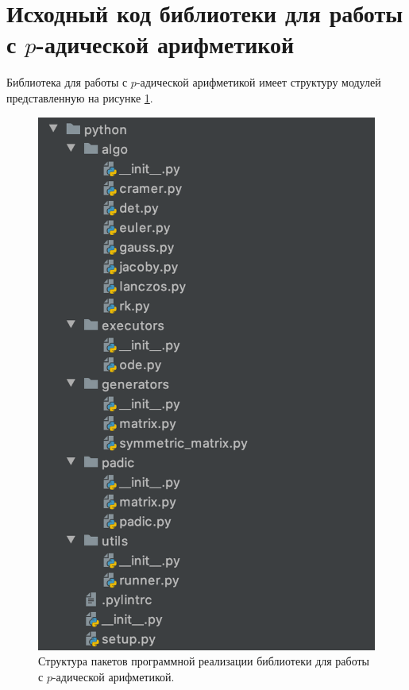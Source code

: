 \documentclass[master, och, diploma, times]{sty/SCWorks}
\theoremstyle{plain}
\theoremstyle{definition}
\numberwithin{equation}{section}
\begin{document}
\appendix

\section{Исходный код библиотеки для работы с $p$-адической арифметикой}


Библиотека для работы с $p$-адической арифметикой имеет структуру модулей представленную на рисунке \ref{img:code:struct}.

\begin{figure}[H]
\centerline{
\includegraphics[width=0.5\linewidth]{images/code_struct}}
\caption{Структура пакетов программной реализации библиотеки для работы с $p$-адической арифметикой.}
\label{img:code:struct}
\end{figure}






\end{document}
